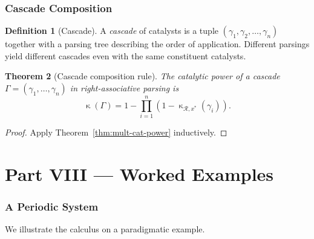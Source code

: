 \documentclass[twocolumn,11pt,a4paper]{article}
\theoremstyle{thmstyle}
\newtheorem{theorem}{Theorem}[section]
\theoremstyle{thmstyle}
\theoremstyle{definition}
\newtheorem{definition}[theorem]{Definition}
\theoremstyle{remark}
\DeclareMathOperator{\catpow}{\kappa}
\newcommand{\receiver}{\mathcal{R}}
\begin{document}
\section{Cascade Composition}
\label{sec:cascade-composition}

\begin{definition}[Cascade]\label{def:cascade}
A \emph{cascade} of catalysts is a tuple
$(\gamma_{1}, \gamma_{2}, \ldots, \gamma_{n})$
together with a parsing tree describing the order
of application.  Different parsings yield different
cascades even with the same constituent catalysts.
\end{definition}

\begin{theorem}[Cascade composition rule]
\label{thm:cascade-comp-rule}
The catalytic power of a cascade
$\Gamma = (\gamma_{1}, \ldots, \gamma_{n})$ in
right-associative parsing is
\[
\catpow(\Gamma) = 1 - \prod_{i=1}^{n}
   (1 - \catpow_{\receiver, x^{*}}(\gamma_{i})).
\]
\end{theorem}

\begin{proof}
Apply Theorem~\ref{thm:mult-cat-power}
inductively.
\end{proof}



\part*{Part VIII --- Worked Examples}

\section{A Periodic System}
\label{sec:periodic-example}

We illustrate the calculus on a paradigmatic example.
\end{document}
